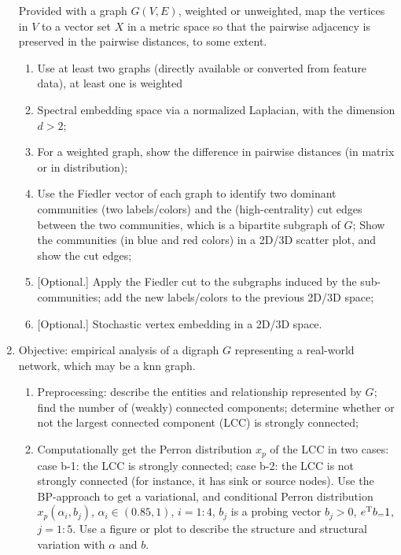 \begin{enumerate}
  Provided with a graph $G(V,E)$, weighted or unweighted, map the
  vertices in $V$ to a vector set $X$ in a metric space so that the
  pairwise adjacency is preserved in the pairwise distances, to some
  extent.

  \begin{enumerate} 
  \item Use at least two graphs (directly available or converted from
    feature data), at least one is weighted
    
  \item Spectral embedding space via a normalized Laplacian,
    with the dimension $d > 2$;

  \item For a weighted graph, show the difference in pairwise
    distances (in matrix or in distribution); 

  \item Use the Fiedler vector of each graph to identify two dominant
    communities (two labels/colors) and the (high-centrality) cut
    edges between the two communities, which is a bipartite subgraph
    of $G$; Show the communities (in blue and red colors) in a 2D/3D
    scatter plot, and show the cut edges;

  \item {[Optional.]}  Apply the Fiedler cut to the subgraphs
    induced by the sub-communities; add the new labels/colors to
    the previous 2D/3D space; 

    
  \item {[Optional.]}  Stochastic vertex embedding in a 2D/3D space.

  \end{enumerate} 

  \newpage 
\item Objective: empirical analysis of a digraph $G$ representing a
  real-world network, which may be a knn graph.

  \begin{enumerate}
  \item Preprocessing: describe the entities and relationship
    represented by $G$; find the number of (weakly) connected
    components; determine whether or not the largest connected
    component (LCC) is strongly connected;
    
  \item Computationally get the Perron distribution $x_p$ of the LCC
    in two cases: case b-1: the LCC is strongly connected; case b-2:
    the LCC is not strongly connected (for instance, it has sink or
    source nodes). Use the BP-approach to get a variational, and
    conditional Perron distribution $x_{p}(\alpha_{i},b_j)$,
    $\alpha_i \in (0.85,1)$, $i=1:4$, $b_j$ is a probing vector
    $b_j>0$, $e^{\rm T}b_=1$, $j=1:5$. Use a figure or plot to
    describe the structure and structural variation with $\alpha$ and
    $b$.


\end{enumerate}
\end{enumerate}
